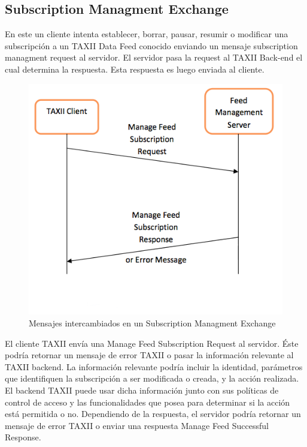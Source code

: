 \subsection{Subscription Managment Exchange}

En este un cliente intenta establecer, borrar, pausar, resumir o modificar una 
subscripción a un TAXII Data Feed conocido enviando un mensaje subscription 
managment request al servidor. El servidor pasa la request al TAXII Back-end el 
cual determina la respuesta. Esta respuesta es luego enviada al cliente.

\begin{figure}[ht!]
  \centering
    \includegraphics[width=150mm]{./images/SubscriptionManagmentExchange.png}
    \caption{Mensajes intercambiados en un Subscription Managment Exchange \protect\cite{b1}} 
\end{figure}

El cliente TAXII envía una Manage Feed Subscription Request al servidor. Éste 
podría retornar un mensaje de error TAXII o pasar la información relevante al 
TAXII backend. La información relevante podría incluir la identidad, parámetros 
que identifiquen la subscripción a ser modificada o creada, y la acción 
realizada. El backend TAXII puede usar dicha información junto con sus 
políticas de control de acceso y las funcionalidades que posea para determinar 
si la acción está permitida o no. Dependiendo de la respuesta, el servidor 
podría retornar un mensaje de error TAXII o enviar una respuesta Manage Feed 
Successful Response.

